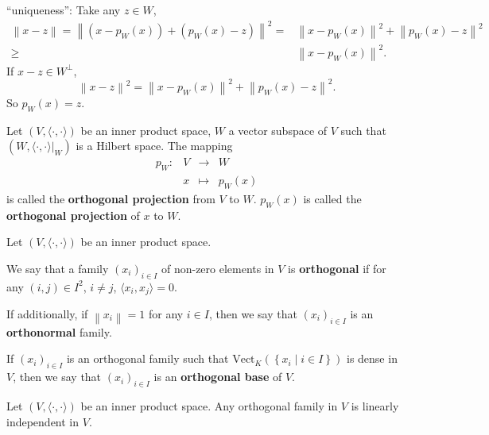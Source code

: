 \begin{proofenv}
    \quad ``uniqueness'': Take any $z \in W$, 
    $$ \begin{aligned}
        \left\| x - z\right\| = \left\| (x - p_W(x)) + (p_W(x) - z)\right\|^2 =& \left\| x - p_W(x)\right\|^2 + \left\| p_W(x) - z\right\|^2 \\
        \ge& \left\| x - p_W(x)\right\|^2.
    \end{aligned}$$
    If $x - z \in W^\perp$,
    $$ \left\| x - z\right\|^2 = \left\| x - p_W(x)\right\|^2 + \left\| p_W(x) - z\right\|^2.$$
    So $p_W(x) = z$.
\end{proofenv}

\begin{definitionenv}
    Let $\left(V, \langle \cdot, \cdot\rangle\right)$ be an inner product space, $W$ a vector subspace of $V$ such that $\left(W, \left.\langle\cdot,\cdot\rangle\right|_W\right)$ is a Hilbert space. The mapping
    $$\begin{array}{rrcl}
        p_W: & V & \rightarrow & W\\
        & x & \mapsto & p_W(x)
    \end{array}$$
    is called the \textbf{orthogonal projection} from $V$ to $W$. $p_W(x)$ is called the \textbf{orthogonal projection} of $x$ to $W$.
\end{definitionenv}
\begin{definitionenv}
    Let $\left(V, \langle \cdot, \cdot\rangle\right)$ be an inner product space.
    
    \quad We say that a family $\left(x_i\right)_{i\in I}$ of non-zero elements in $V$ is \textbf{orthogonal} if for any $\left(i,j\right)\in I^2$, $i\neq j$, $\langle x_i, x_j\rangle = 0$. 
    
    \quad If additionally, if $ \left\| x_i \right\| = 1 $ for any $i\in I$, then we say that $\left(x_i\right)_{i\in I}$ is an \textbf{orthonormal} family.
    
    \quad If $\left(x_i\right)_{i\in I}$ is an orthogonal family such that  $\mathrm{Vect}_{K}\left(\left\{ x_i \mid  i\in I \right\}\right)$ is dense in $V$, then we say that $\left(x_i\right)_{i\in I}$ is an \textbf{orthogonal base} of $V$.
\end{definitionenv}
\begin{propositionenv}
    Let $\left(V, \langle \cdot, \cdot\rangle\right)$ be an inner product space.
    Any orthogonal family in $V$ is linearly independent in $V$.
\end{propositionenv}

